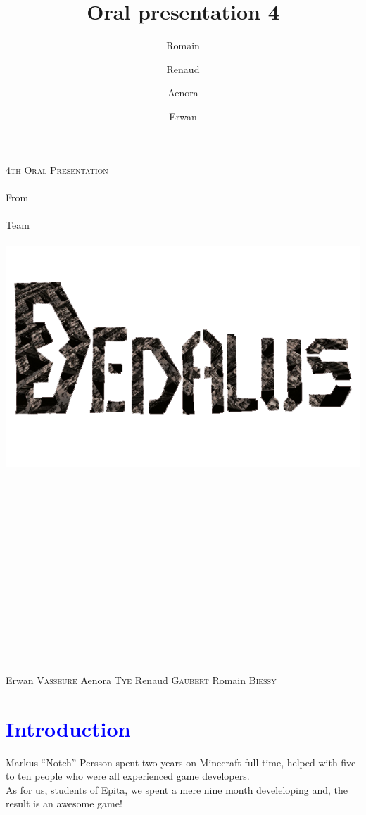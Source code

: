 \documentclass[article]{report}         %
\title {Oral presentation 4}
\author {Romain\and Renaud\and Aenora\and Erwan}
\date {}
\begin{document}
  \thispagestyle{empty}
    \begin{titlepage} 
    \vspace*{1cm} 
      \begin{center} 
        {\huge{\textsc{4th Oral Presentation} \\ ~ \\{\large From}\\ ~\\ Team \\  ~ \\ }}
        \includegraphics[width = 14cm]{images/Titles/Dedalus.png}
      \\ ~ \\ ~ \\ ~ \\ ~ \\ ~ \\ ~ \\ ~ \\ ~ \\ ~ \\ ~ \\ ~ \\ ~ \\ ~ \\ ~ 
    \end{center}
      \hfill {\large Erwan  \textsc{Vasseure}}
      \hfill {\large Aenora \textsc{Tye}}
      \hfill {\large Renaud \textsc{Gaubert}}
      \hfill {\large Romain \textsc{Biessy}}
    \end{titlepage} 

    \tableofcontents
      \setcounter{page}{2}
      \newpage
    \chapter{\textcolor{blue}{Introduction}}
      Markus ``Notch'' Persson spent two years on Minecraft full time, helped with five to ten people who were all experienced game developers. \\
      As for us, students of Epita, we spent a mere nine month develeloping and, the result is an awesome game!\\
\end{document}
